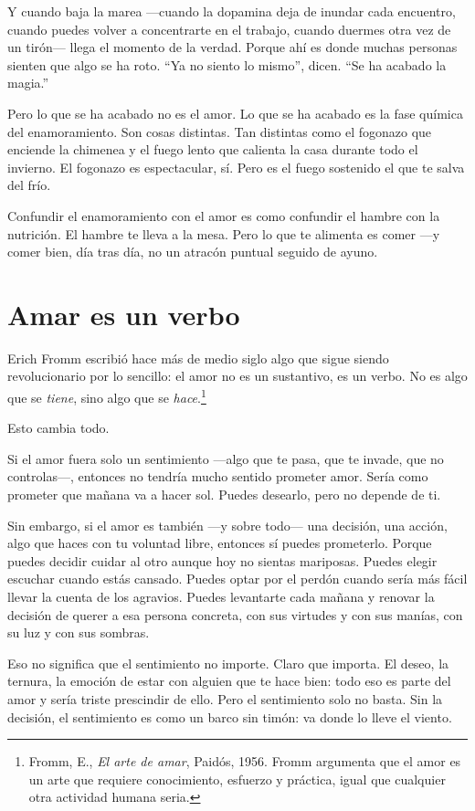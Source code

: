 Y cuando baja la marea ---cuando la dopamina deja de inundar cada encuentro, cuando puedes volver a concentrarte en el trabajo, cuando duermes otra vez de un tirón--- llega el momento de la verdad. Porque ahí es donde muchas personas sienten que algo se ha roto. ``Ya no siento lo mismo'', dicen. ``Se ha acabado la magia.''

Pero lo que se ha acabado no es el amor. Lo que se ha acabado es la fase química del enamoramiento. Son cosas distintas. Tan distintas como el fogonazo que enciende la chimenea y el fuego lento que calienta la casa durante todo el invierno. El fogonazo es espectacular, sí. Pero es el fuego sostenido el que te salva del frío.

Confundir el enamoramiento con el amor es como confundir el hambre con la nutrición. El hambre te lleva a la mesa. Pero lo que te alimenta es comer ---y comer bien, día tras día, no un atracón puntual seguido de ayuno.

\section{Amar es un verbo}

Erich Fromm escribió hace más de medio siglo algo que sigue siendo revolucionario por lo sencillo: el amor no es un sustantivo, es un verbo. No es algo que se \textit{tiene}, sino algo que se \textit{hace}.\footnote{Fromm, E., \textit{El arte de amar}, Paidós, 1956. Fromm argumenta que el amor es un arte que requiere conocimiento, esfuerzo y práctica, igual que cualquier otra actividad humana seria.}

Esto cambia todo.

Si el amor fuera solo un sentimiento ---algo que te pasa, que te invade, que no controlas---, entonces no tendría mucho sentido prometer amor. Sería como prometer que mañana va a hacer sol. Puedes desearlo, pero no depende de ti.

Sin embargo, si el amor es también ---y sobre todo--- una decisión, una acción, algo que haces con tu voluntad libre, entonces sí puedes prometerlo. Porque puedes decidir cuidar al otro aunque hoy no sientas mariposas. Puedes elegir escuchar cuando estás cansado. Puedes optar por el perdón cuando sería más fácil llevar la cuenta de los agravios. Puedes levantarte cada mañana y renovar la decisión de querer a esa persona concreta, con sus virtudes y con sus manías, con su luz y con sus sombras.

Eso no significa que el sentimiento no importe. Claro que importa. El deseo, la ternura, la emoción de estar con alguien que te hace bien: todo eso es parte del amor y sería triste prescindir de ello. Pero el sentimiento solo no basta. Sin la decisión, el sentimiento es como un barco sin timón: va donde lo lleve el viento.

